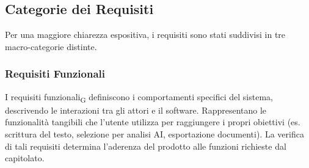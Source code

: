\documentclass[11pt,a4paper]{article}
\begin{document}
\subsection{Categorie dei Requisiti}
Per una maggiore chiarezza espositiva, i requisiti sono stati suddivisi in tre macro-categorie distinte.

\subsubsection{Requisiti Funzionali}
I requisiti funzionali\textsubscript{G} definiscono i comportamenti specifici del sistema, descrivendo le interazioni tra gli attori e il software.
Rappresentano le funzionalità tangibili che l'utente utilizza per raggiungere i propri obiettivi (es. scrittura del testo, selezione per analisi AI, esportazione documenti). La verifica di tali requisiti determina l'aderenza del prodotto alle funzioni richieste dal capitolato.
\end{document}
